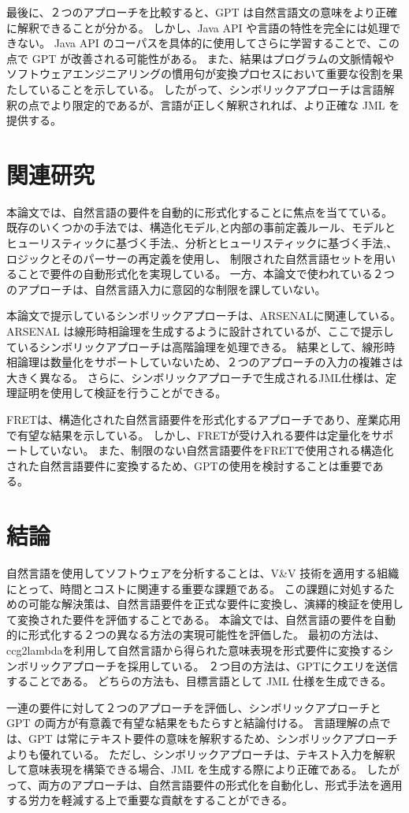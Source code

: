 \documentclass[uplatex, twocolumn,10pt]{jsarticle} %
\begin{document}
最後に、２つのアプローチを比較すると、GPT は自然言語文の意味をより正確に解釈できることが分かる。
しかし、Java API や言語の特性を完全には処理できない。
Java API のコーパスを具体的に使用してさらに学習することで、この点で GPT が改善される可能性がある。
また、結果はプログラムの文脈情報やソフトウェアエンジニアリングの慣用句が変換プロセスにおいて重要な役割を果たしていることを示している。
したがって、シンボリックアプローチは言語解釈の点でより限定的であるが、言語が正しく解釈されれば、より正確な JML を提供する。

\section{関連研究}
\label{sec:related_work}
本論文では、自然言語の要件を自動的に形式化することに焦点を当てている。
既存のいくつかの手法では、構造化モデル\cite{8},\cite{9}と内部の事前定義ルール\cite{10}、モデルとヒューリスティックに基づく手法\cite{11},\cite{12}、分析とヒューリスティックに基づく手法\cite{13},\cite{14}、ロジックとそのパーサーの再定義\cite{15}を使用し、
制限された自然言語セットを用いることで要件の自動形式化を実現している。
一方、本論文で使われている２つのアプローチは、自然言語入力に意図的な制限を課していない。

本論文で提示しているシンボリックアプローチは、ARSENAL\cite{16}に関連している。
ARSENAL は線形時相論理を生成するように設計されているが、ここで提示しているシンボリックアプローチは高階論理を処理できる。
結果として、線形時相論理は数量化をサポートしていないため、２つのアプローチの入力の複雑さは大きく異なる。
さらに、シンボリックアプローチで生成されるJML仕様は、定理証明を使用して検証を行うことができる。

FRET\cite{17}は、構造化された自然言語要件を形式化するアプローチであり、産業応用で有望な結果を示している。
しかし、FRETが受け入れる要件は定量化をサポートしていない。
また、制限のない自然言語要件をFRETで使用される構造化された自然言語要件に変換するため、GPTの使用を検討することは重要である。

\section{結論}
\label{sec:conclusion}
自然言語を使用してソフトウェアを分析することは、V\&V 技術を適用する組織にとって、時間とコストに関連する重要な課題である。
この課題に対処するための可能な解決策は、自然言語要件を正式な要件に変換し、演繹的検証を使用して変換された要件を評価することである。
本論文では、自然言語の要件を自動的に形式化する２つの異なる方法の実現可能性を評価した。
最初の方法は、ccg2lambda\cite{3}を利用して自然言語から得られた意味表現を形式要件に変換するシンボリックアプローチを採用している。
２つ目の方法は、GPT\cite{2}にクエリを送信することである。
どちらの方法も、目標言語として JML 仕様を生成できる。

一連の要件に対して２つのアプローチを評価し、シンボリックアプローチと GPT の両方が有意義で有望な結果をもたらすと結論付ける。
言語理解の点では、GPT は常にテキスト要件の意味を解釈するため、シンボリックアプローチよりも優れている。
ただし、シンボリックアプローチは、テキスト入力を解釈して意味表現を構築できる場合、JML を生成する際により正確である。
したがって、両方のアプローチは、自然言語要件の形式化を自動化し、形式手法を適用する労力を軽減する上で重要な貢献をすることができる。
\end{document}
